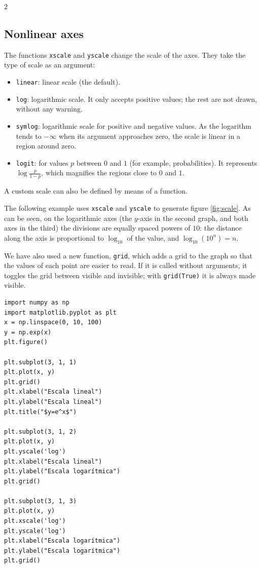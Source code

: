 \begin{paracol}{2}
\subsection{Nonlinear axes}
The functions \texttt{xscale} and \texttt{yscale} change the scale of the axes. They take the type of scale as an argument:
    \begin{itemize}
        \item \texttt{\textquotesingle{}linear\textquotesingle{}}: linear scale (the default).
        \item \texttt{\textquotesingle{}log\textquotesingle{}}: logarithmic scale. It only accepts positive values; the rest are not drawn, without any warning.
        \item \texttt{\textquotesingle{}symlog\textquotesingle{}}: logarithmic scale for positive and negative values. As the logarithm tends to $-\infty$ when its argument approaches zero, the scale is linear in a region around zero.
        \item \texttt{\textquotesingle{}logit\textquotesingle{}}: for values $p$ between $0$ and $1$ (for example, probabilities). It represents $\log\frac{p}{1-p}$, which magnifies the regions close to $0$ and $1$.
    \end{itemize}
A custom scale can also be defined by means of a function.

The following example uses \texttt{xscale} and \texttt{yscale} to generate figure \ref{fig:scale}. As can be seen, on the logarithmic axes (the $y$-axis in the second graph, and both axes in the third) the divisions are equally spaced powers of $10$: the distance along the axis is proportional to $\log_{10}$ of the value, and $\log_{10}(10^n)=n$.

We have also used a new function, \texttt{grid}, which adds a grid to the graph so that the values of each point are easier to read. If it is called without arguments, it toggles the grid between visible and invisible; with \texttt{grid(True)} it is always made visible.
\end{paracol}
\begin{verbatim}
import numpy as np
import matplotlib.pyplot as plt
x = np.linspace(0, 10, 100)
y = np.exp(x)
plt.figure()

plt.subplot(3, 1, 1)
plt.plot(x, y)
plt.grid()
plt.xlabel("Escala lineal")
plt.ylabel("Escala lineal")
plt.title("$y=e^x$")

plt.subplot(3, 1, 2)
plt.plot(x, y)
plt.yscale('log')
plt.xlabel("Escala lineal")
plt.ylabel("Escala logarítmica")
plt.grid()

plt.subplot(3, 1, 3)
plt.plot(x, y)
plt.xscale('log')
plt.yscale('log')
plt.xlabel("Escala logarítmica")
plt.ylabel("Escala logarítmica")
plt.grid()
\end{verbatim}

